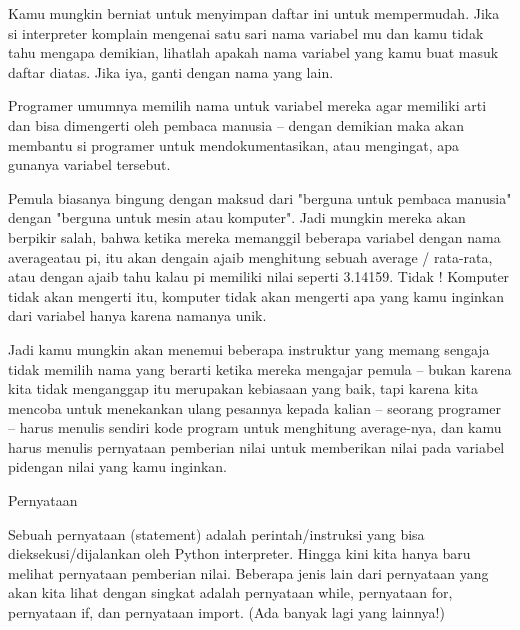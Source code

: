 

\vspace{12pt}
\noindent 
Kamu mungkin berniat untuk menyimpan daftar ini untuk mempermudah. Jika si interpreter komplain mengenai satu sari nama variabel mu dan kamu tidak tahu mengapa demikian, lihatlah apakah nama variabel yang kamu buat masuk daftar diatas. Jika iya, ganti dengan nama yang lain. \par
\vspace{12pt}
\noindent 
Programer umumnya memilih nama untuk variabel mereka agar memiliki arti dan bisa dimengerti oleh pembaca manusia -- dengan demikian maka akan membantu si programer untuk mendokumentasikan, atau mengingat, apa gunanya variabel tersebut. \par
\vspace{12pt}
\vspace{12pt}
\noindent 
Pemula biasanya bingung dengan maksud dari "berguna untuk pembaca manusia" dengan "berguna untuk mesin atau komputer". Jadi mungkin mereka akan berpikir salah, bahwa ketika mereka memanggil beberapa variabel dengan nama $  $averageatau $  $pi, itu akan dengain ajaib menghitung sebuah average / rata-rata, atau dengan ajaib tahu kalau pi memiliki nilai seperti 3.14159. Tidak ! Komputer tidak akan mengerti itu, komputer tidak akan mengerti apa yang kamu inginkan dari variabel hanya karena namanya unik. \par
\vspace{12pt}
\noindent 
Jadi kamu mungkin akan menemui beberapa instruktur yang memang sengaja tidak memilih nama yang berarti ketika mereka mengajar pemula -- bukan karena kita tidak menganggap itu merupakan kebiasaan yang baik, tapi karena kita mencoba untuk menekankan ulang pesannya kepada kalian -- seorang programer -- harus menulis sendiri kode program untuk menghitung average-nya, dan kamu harus menulis pernyataan pemberian nilai untuk memberikan nilai pada variabel $  $pidengan nilai yang kamu inginkan. \par
\vspace{12pt}
\noindent 
 Pernyataan \par
\vspace{12pt}
\noindent 
Sebuah $  $pernyataan $  $(statement) adalah perintah/instruksi yang bisa dieksekusi/dijalankan oleh Python interpreter. Hingga kini kita hanya baru melihat pernyataan pemberian nilai. Beberapa jenis lain dari pernyataan yang akan kita lihat dengan singkat adalah pernyataan $  $while, pernyataan $  $for, pernyataan $  $if, dan pernyataan $  $import. (Ada banyak lagi yang lainnya!) \par
